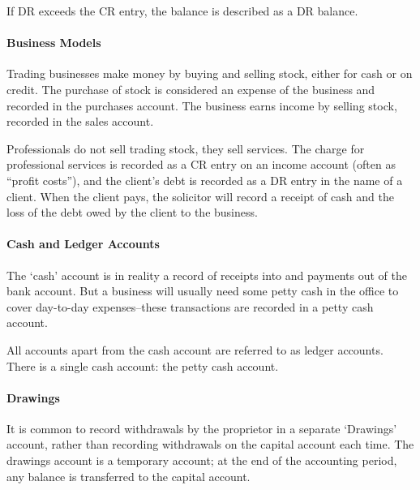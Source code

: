 \documentclass[
]{article}
\newenvironment{Shaded}{}{}
\newcommand{\NormalTok}[1]{#1}
\begin{document}
If DR exceeds the CR entry, the balance is described as a DR balance.

\hypertarget{business-models}{%
\paragraph{Business Models}\label{business-models}}

Trading businesses make money by buying and selling stock, either for
cash or on credit. The purchase of stock is considered an expense of the
business and recorded in the purchases account. The business earns
income by selling stock, recorded in the sales account.

Professionals do not sell trading stock, they sell services. The charge
for professional services is recorded as a CR entry on an income account
(often as ``profit costs''), and the client's debt is recorded as a DR
entry in the name of a client. When the client pays, the solicitor will
record a receipt of cash and the loss of the debt owed by the client to
the business.

\hypertarget{cash-and-ledger-accounts}{%
\paragraph{Cash and Ledger Accounts}\label{cash-and-ledger-accounts}}

The `cash' account is in reality a record of receipts into and payments
out of the bank account. But a business will usually need some petty
cash in the office to cover day-to-day expenses--these transactions are
recorded in a petty cash account.

\begin{Shaded}
\begin{Highlighting}[]
\NormalTok{All accounts apart from the cash account are referred to as ledger accounts. There is a single cash account: the petty cash account.}
\end{Highlighting}
\end{Shaded}

\hypertarget{drawings}{%
\paragraph{Drawings}\label{drawings}}

It is common to record withdrawals by the proprietor in a separate
`Drawings' account, rather than recording withdrawals on the capital
account each time. The drawings account is a temporary account; at the
end of the accounting period, any balance is transferred to the capital
account.
\end{document}

